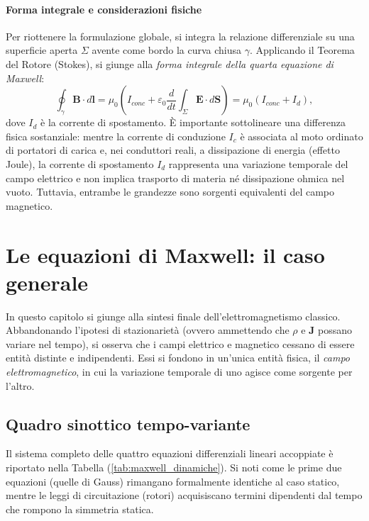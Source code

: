 \documentclass[a4paper,11pt]{report}
\begin{document}
\subsubsection{Forma integrale e considerazioni fisiche}
Per riottenere la formulazione globale, si integra la relazione differenziale su una superficie aperta $\Sigma$ avente come bordo la curva chiusa $\gamma$. Applicando il Teorema del Rotore (Stokes), si giunge alla \textit{forma integrale della quarta equazione di Maxwell}:
\begin{equation}
\oint_\gamma \bm{B} \cdot d\bm{l} = \mu_0 \left( I_{conc} + \varepsilon_0 \frac{d}{dt}\int_\Sigma \bm{E} \cdot d\bm{S} \right) = \mu_0 (I_{conc} + I_{d}),
\end{equation}
dove $I_d$ è la corrente di spostamento.
È importante sottolineare una differenza fisica sostanziale: mentre la corrente di conduzione $I_c$ è associata al moto ordinato di portatori di carica e, nei conduttori reali, a dissipazione di energia (effetto Joule), la corrente di spostamento $I_d$ rappresenta una variazione temporale del campo elettrico e non implica trasporto di materia né dissipazione ohmica nel vuoto. Tuttavia, entrambe le grandezze sono sorgenti equivalenti del campo magnetico. 

\chapter{Le equazioni di Maxwell: il caso generale}

In questo capitolo si giunge alla sintesi finale dell'elettromagnetismo classico. Abbandonando l'ipotesi di stazionarietà (ovvero ammettendo che $\rho$ e $\bm{J}$ possano variare nel tempo), si osserva che i campi elettrico e magnetico cessano di essere entità distinte e indipendenti. Essi si fondono in un'unica entità fisica, il \textit{campo elettromagnetico}, in cui la variazione temporale di uno agisce come sorgente per l'altro.

\section{Quadro sinottico tempo-variante}

Il sistema completo delle quattro equazioni differenziali lineari accoppiate è riportato nella Tabella (\ref{tab:maxwell_dinamiche}). Si noti come le prime due equazioni (quelle di Gauss) rimangano formalmente identiche al caso statico, mentre le leggi di circuitazione (rotori) acquisiscano termini dipendenti dal tempo che rompono la simmetria statica.
\end{document}
